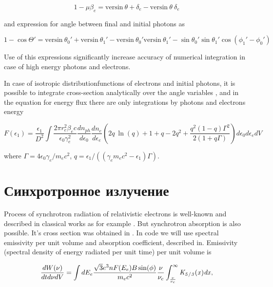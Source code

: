 \begin{equation}
	1 - \mu \beta_e =\text{versin}~\theta + \delta_e - \text{versin}~\theta~\delta_e
\end{equation}

and expression for angle between final and initial photons as

\begin{equation}
	1 - \cos \Theta' = \text{versin}~\theta_0' + \text{versin}~\theta_1' - \text{versin}~ \theta_0' \text{versin}~\theta_1' - \sin \theta_0'\sin \theta_1' \cos(\phi_1'-\phi_0')
\end{equation}

Use of this expressions significantly increase accuracy of numerical integration in case of high energy photons and electrons.

In case of isotropic distributionfunctions of electrons and initial photons, it is possible to integrate cross-section analytically over the angle variables \cite{JonesCompton, BykovUvarov2000}, and in the equation for energy flux there are only integrations by photons and electrons energy

\begin{equation}
	F(\epsilon_1)=\frac{\epsilon_1}{D^2}\int \frac{2 \pi r_e^2 \beta_e c}{\epsilon_0 \gamma_e^2} \frac{dn_{ph}}{d\epsilon_0}\frac{dn_e}{d\epsilon_e}(2 q~ \ln(q)+1+q-2q^2+\frac{q^2(1-q)\Gamma^2}{2(1+q\Gamma)})d\epsilon_0 d\epsilon_e dV
\end{equation}

where $\Gamma=4\epsilon_0\gamma_e/m_e c^2$, $q=\epsilon_1/((\gamma_e m_e c^2-\epsilon_1)\Gamma)$.

\section{Синхротронное излучение}\label{synchrotronFormulaSection}

Process of synchrotron radiation of relativistic electrons is well-known and described in classical works as for example \cite{Ginzburg1975}. But synchrotron absorption is also possible. It's cross section was obtained in \cite{Ghisellini1991}. In code we will use spectral emissivity per unit volume and absorption coefficient, described in\cite{Ghisellini}.
Emissivity (spectral density of energy radiated per unit time) per unit volume is

\begin{equation} \label{emission}
	\frac{dW(\nu)}{dt d\nu dV}=\int dE_e \frac {\sqrt {3}{e}^{3}n F(E_e) B \sin ( \phi)}{{m_e}{c}^{2}}
	\frac{\nu}{\nu_c}\int_{\frac {\nu}{\nu_c}}^{\infty }\it K_{5/3}(x)dx,
\end{equation}

